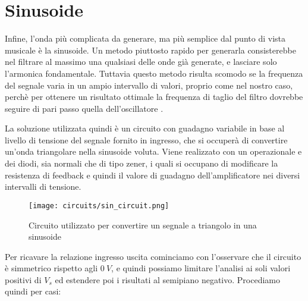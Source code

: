 
\section{Sinusoide}


Infine, l'onda più complicata da generare, ma più semplice dal punto di vista musicale è la
sinusoide. Un metodo piuttosto rapido per generarla consisterebbe nel filtrare al massimo una
qualsiasi delle onde già generate, e lasciare solo l'armonica fondamentale. Tuttavia questo
metodo risulta scomodo se la frequenza del segnale varia in un ampio intervallo di valori,
proprio come nel nostro caso, perchè per ottenere un risultato ottimale la frequenza di taglio
del filtro dovrebbe seguire di pari passo quella dell'oscillatore .

La soluzione utilizzata quindi è un circuito con guadagno variabile in base al livello di
tensione del segnale fornito in ingresso, che si occuperà di convertire un'onda triangolare
nella sinusoide voluta. Viene realizzato con un operazionale e dei diodi, sia normali che di
tipo zener, i quali si occupano di modificare la resistenza di feedback e quindi il valore di
guadagno dell'amplificatore nei diversi intervalli di tensione.

\begin{figure}[H]
    \centering
    \texttt{[image: circuits/sin\_circuit.png]}
    \caption{Circuito utilizzato per convertire un segnale a triangolo in una sinusoide}
    \label{sin_circuit}
\end{figure}

Per ricavare la relazione ingresso uscita cominciamo con l'osservare che il circuito è
simmetrico rispetto agli $0\ V$, e quindi possiamo limitare l'analisi ai soli valori positivi
di $V_s$ ed estendere poi i risultati al semipiano negativo. Procediamo quindi per casi:

